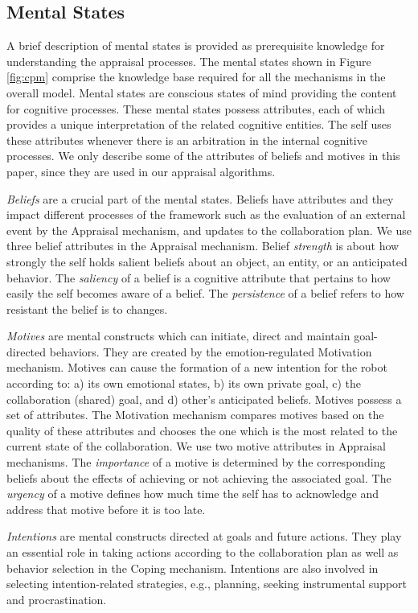 \documentclass{sig-alternate-05-2015}
\begin{document}
\subsection{Mental States}
\label{sec:mental-states}
A brief description of mental states is provided as prerequisite knowledge for
understanding the appraisal processes. The mental states shown in Figure
\ref{fig:cpm} comprise the knowledge base required for all the mechanisms in the
overall model. Mental states are conscious states of mind providing the content
for cognitive processes. These mental states possess attributes, each of which
provides a unique interpretation of the related cognitive entities. The self
uses these attributes whenever there is an arbitration in the internal cognitive
processes. We only describe some of the attributes of beliefs and motives in
this paper, since they are used in our appraisal algorithms.

\textit{Beliefs} are a crucial part of the mental states. Beliefs have
attributes and they impact different processes of the framework such as the
evaluation of an external event by the Appraisal mechanism, and updates to the
collaboration plan. We use three belief attributes in the Appraisal mechanism.
Belief \textit{strength} is about how strongly the self holds salient beliefs
about an object, an entity, or an anticipated behavior. The \textit{saliency} of
a belief is a cognitive attribute that pertains to how easily the self becomes
aware of a belief. The \textit{persistence} of a belief refers to how resistant
the belief is to changes.

\textit{Motives} are mental constructs which can initiate, direct and maintain
goal-directed behaviors. They are created by the emotion-regulated Motivation
mechanism. Motives can cause the formation of a new intention for the robot
according to: a) its own emotional states, b) its own private goal, c) the
collaboration (shared) goal, and d) other's anticipated beliefs. Motives possess
a set of attributes. The Motivation mechanism compares motives based on the
quality of these attributes and chooses the one which is the most related to the
current state of the collaboration. We use two motive attributes in Appraisal
mechanisms. The \textit{importance} of a motive is determined by the
corresponding beliefs about the effects of achieving or not achieving the
associated goal. The \textit{urgency} of a motive defines how much time the self
has to acknowledge and address that motive before it is too late.

\textit{Intentions} are mental constructs directed at goals and future actions.
They play an essential role in taking actions according to the collaboration
plan as well as behavior selection in the Coping mechanism. Intentions are
also involved in selecting intention-related strategies, e.g., planning, seeking
instrumental support and procrastination. 
\end{document}
